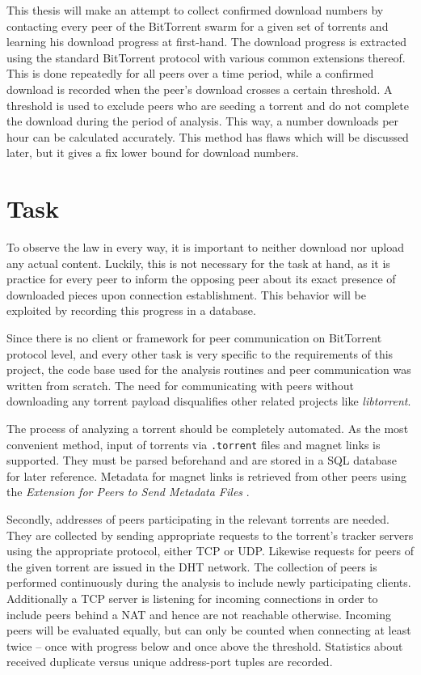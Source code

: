 \documentclass[10pt, a4paper, twoside=false, headsepline]{scrbook}
\renewcommand{\_}{\origunderscore\allowbreak}
\begin{document}
This thesis will make an attempt to collect confirmed download numbers by contacting every peer of the BitTorrent swarm for a given set of torrents and learning his download progress at first-hand. The download progress is extracted using the standard BitTorrent protocol with various common extensions thereof. This is done repeatedly for all peers over a time period, while a confirmed download is recorded when the peer's download crosses a certain threshold. A threshold is used to exclude peers who are seeding a torrent and do not complete the download during the period of analysis. This way, a number downloads per hour can be calculated accurately. This method has flaws which will be discussed later, but it gives a fix lower bound for download numbers.

\section{Task}
To observe the law in every way, it is important to neither download nor upload any actual content. Luckily, this is not necessary for the task at hand, as it is practice for every peer to inform the opposing peer about its exact presence of downloaded pieces upon connection establishment. This behavior will be exploited by recording this progress in a database.

Since there is no client or framework for peer communication on BitTorrent protocol level, and every other task is very specific to the requirements of this project, the code base used for the analysis routines and peer communication was written from scratch. The need for communicating with peers without downloading any torrent payload disqualifies other related projects like \emph{libtorrent}.

The process of analyzing a torrent should be completely automated. As the most convenient method, input of torrents via \texttt{.torrent} files and magnet links is supported. They must be parsed beforehand and are stored in a SQL database for later reference. Metadata for magnet links is retrieved from other peers using the \emph{Extension for Peers to Send Metadata Files} \cite{bep9}.

Secondly, addresses of peers participating in the relevant torrents are needed. They are collected by sending appropriate requests to the torrent's tracker servers using the appropriate protocol, either TCP or UDP. Likewise requests for peers of the given torrent are issued in the DHT network. The collection of peers is performed continuously during the analysis to include newly participating clients. Additionally a TCP server is listening for incoming connections in order to include peers behind a NAT and hence are not reachable otherwise. Incoming peers will be evaluated equally, but can only be counted when connecting at least twice -- once with progress below and once above the threshold. Statistics about received duplicate versus unique address-port tuples are recorded.
\end{document}
